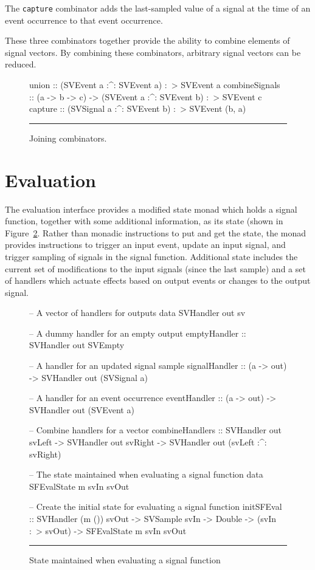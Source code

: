 The {\tt capture} combinator adds the last-sampled value of a signal at the time
of an event occurrence to that event occurrence.

These three combinators together provide the ability to combine elements of
signal vectors. By combining these combinators, arbitrary signal vectors can
be reduced.

\begin{figure}
\begin{code}
union          :: (SVEvent a :^: SVEvent a) :~> SVEvent a
combineSignals :: (a -> b -> c) -> (SVEvent a :^: SVEvent b) :~> SVEvent c
capture        :: (SVSignal a :^: SVEvent b) :~> SVEvent (b, a)
\end{code}
\hrule
\caption{Joining combinators.}
\label{figure:joining_combinators}
\end{figure}

\section{Evaluation}
\label{section:System_Design_and_Interface-Evaluator}

The evaluation interface provides a modified state monad which holds a signal
function, together with some additional information, as its state (shown in Figure~\ref{figure:evaluation_state}.
Rather than monadic instructions to put and get the state, the monad provides instructions
to trigger an input event, update an input signal, and trigger sampling of
signals in the signal function. Additional state includes the current set of
modifications to the input signals (since the last sample) and a set of
handlers which actuate effects based on output events or changes to the output
signal.

\begin{figure}
\begin{code}
-- A vector of handlers for outputs
data SVHandler out sv

-- A dummy handler for an empty output
emptyHandler    :: SVHandler out SVEmpty

-- A handler for an updated signal sample
signalHandler   :: (a -> out) -> SVHandler out (SVSignal a)

-- A handler for an event occurrence
eventHandler    :: (a -> out) -> SVHandler out (SVEvent a)

-- Combine handlers for a vector
combineHandlers ::    SVHandler out svLeft
                   -> SVHandler out svRight
                   -> SVHandler out (svLeft :^: svRight)

-- The state maintained when evaluating a signal function
data SFEvalState m svIn svOut

-- Create the initial state for evaluating a signal function
initSFEval ::    SVHandler (m ()) svOut
              -> SVSample svIn
              -> Double
              -> (svIn :~> svOut)
              -> SFEvalState m svIn svOut
\end{code}
\hrule
\caption{State maintained when evaluating a signal function}
\label{figure:evaluation_state}
\end{figure}

